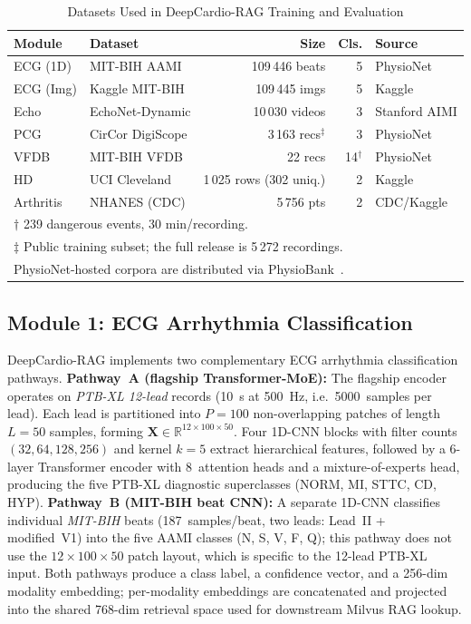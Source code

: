 \documentclass[AMA,STIX1COL,]{WileyNJD-v2}
\begin{document}
\begin{table}[!t]
\caption{Datasets Used in DeepCardio-RAG Training and Evaluation}
\label{tab:datasets}
\centering
\renewcommand{\arraystretch}{1.1}
\begin{tabular}{llrrl}
\toprule
\textbf{Module} & \textbf{Dataset} & \textbf{Size} &
\textbf{Cls.} & \textbf{Source}\\
\midrule
ECG (1D) & MIT-BIH AAMI & 109\,446 beats & 5 & PhysioNet\\
ECG (Img) & Kaggle MIT-BIH & 109\,445 imgs & 5 & Kaggle\\
Echo & EchoNet-Dynamic & 10\,030 videos & 3 & Stanford AIMI\\
PCG & CirCor DigiScope & 3\,163 recs$^{\ddagger}$ & 3 & PhysioNet\\
VFDB & MIT-BIH VFDB & 22 recs & 14$^{\dagger}$ & PhysioNet\\
HD & UCI Cleveland & 1\,025 rows (302 uniq.) & 2 & Kaggle\\
Arthritis & NHANES (CDC) & 5\,756 pts & 2 & CDC/Kaggle\\
\bottomrule
\multicolumn{5}{l}{$\dagger$ 239 dangerous events, 30 min/recording.}\\
\multicolumn{5}{l}{$\ddagger$ Public training subset; the full release is 5\,272 recordings.}\\
\multicolumn{5}{l}{PhysioNet-hosted corpora are distributed via PhysioBank~\cite{goldberger2000}.}
\end{tabular}
\end{table}

\subsection{Module 1: ECG Arrhythmia Classification}

DeepCardio-RAG implements two complementary ECG arrhythmia
classification pathways. \textbf{Pathway~A (flagship Transformer-MoE):}
The flagship encoder operates on \emph{PTB-XL 12-lead} records
(10~s at 500~Hz, i.e.\ 5000~samples per lead). Each lead is partitioned
into $P=100$ non-overlapping patches of length $L=50$ samples, forming
$\mathbf{X}\in\mathbb{R}^{12\times100\times50}$. Four 1D-CNN blocks with
filter counts $(32,64,128,256)$ and kernel $k=5$ extract hierarchical
features, followed by a 6-layer Transformer encoder with 8~attention
heads and a mixture-of-experts head, producing the five PTB-XL
diagnostic superclasses (NORM, MI, STTC, CD, HYP). \textbf{Pathway~B
(MIT-BIH beat CNN):} A separate 1D-CNN classifies individual
\emph{MIT-BIH} beats (187~samples/beat, two leads: Lead~II + modified~V1)
into the five AAMI classes (N, S, V, F, Q); this pathway does not use the
$12\times100\times50$ patch layout, which is specific to the 12-lead
PTB-XL input. Both pathways produce a class label, a confidence vector,
and a 256-dim modality embedding; per-modality embeddings are
concatenated and projected into the shared 768-dim retrieval space used
for downstream Milvus RAG lookup.
\end{document}
